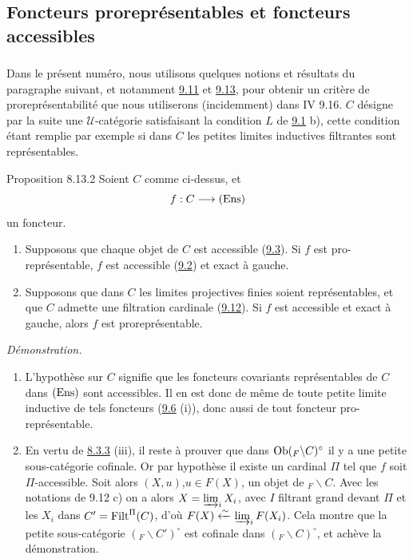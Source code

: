 \documentclass[10pt]{../fichiers-configuration-latex/smfart}
\def\labelenumi{(\theenumi)}
\begin{document}
\subsection{Foncteurs proreprésentables et foncteurs
  accessibles}\pageoriginale

\subsubsection{}
Dans le présent numéro, nous utilisons quelques notions et résultats
du paragraphe suivant, et notamment \hyperref[I.prop9.11]{9.11} et
\hyperref[I.prop9.13]{9.13}, pour obtenir un critère de proreprésentabilité que
nous utiliserons (incidemment) dans IV 9.16. $C$ désigne par la
suite une $𝒰$-catégorie satisfaisant la condition $L$ de
\hyperref[I.def9.1]{9.1} b), cette condition étant remplie par exemple si dans
$C$ les petites limites inductives filtrantes sont représentables.

\begin{enonce*}{Proposition 8.13.2}
Soient $C$ comme ci-dessus, et
$$
f:C\longrightarrow(\operatorname{Ens})
$$
un foncteur.
\begin{enumerate}
\renewcommand{\theenumi}{\alph{enumi}}
\renewcommand{\labelenumi}{\theenumi)}
\item Supposons que chaque objet de $C$ est accessible (\hyperref[I.def9.3]{9.3}). Si $f$
est pro-représentable, $f$ est accessible (\hyperref[I.def9.2]{9.2}) et
exact à gauche.

\item Supposons que dans $C$ les limites projectives finies soient
représentables, et que $C$ admette une filtration cardinale
(\hyperref[I.def9.12]{9.12}). Si $f$ est accessible et exact à gauche, alors $f$ est
proreprésentable.
\end{enumerate}
\end{enonce*}

\noindent \emph{Démonstration.}
\begin{enumerate}
\renewcommand{\theenumi}{\alph{enumi}}
\renewcommand{\labelenumi}{\theenumi)}
\item L'hypothèse sur $C$ signifie que les foncteurs covariants
représentables de $C$ dans $(\operatorname{Ens})$ sont accessibles. Il en est donc
de même de toute petite limite inductive de tels foncteurs
(\hyperref[I.prop9.6]{9.6} (i)), donc aussi de tout foncteur
pro-représentable.

\item En vertu de \hyperref[I.them8.3.3]{8.3.3} (iii), il reste à prouver que dans
$\operatorname{Ob}({}_F\backslash C)^\circ$ il y a une petite sous-catégorie
cofinale. Or par hypothèse il existe un cardinal $\Pi$ tel que $f$
soit $\Pi$-accessible. Soit alors $(X,u)$,\pageoriginale $u\in
F(X)$, un objet de ${}_F\backslash C$. Avec les notations de 9.12 c)
on a alors $X=\varinjlim_i X_i$, avec $I$ filtrant grand devant
$\Pi$ et les $X_i$ dans $C'=\operatorname{Filt}^{\Pi}(C)$, d'où
$F(X)\xleftarrow{\sim}\varinjlim_i F(X_i)$. Cela montre que la
petite sous-catégorie $({}_F\backslash C')^\circ$ est cofinale dans
$({}_F\backslash C)^\circ$, et achève la démonstration.
\end{enumerate}
\end{document}
